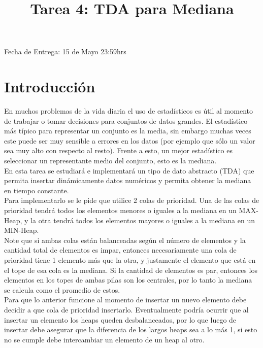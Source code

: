 \documentclass[dcc]{fcfmcourse}
\title{Tarea 4: TDA para Mediana}
\begin{document}
\maketitle
\vspace{-2ex}
\begin{center}
Fecha de Entrega: 15 de Mayo  23:59hrs \\
\end{center}


\section{Introducción}

En muchos problemas de la vida diaria el uso de estadísticos es útil al momento de trabajar o tomar decisiones para conjuntos de datos grandes. El estadístico más típico para representar un conjunto es la media, sin embargo muchas veces este puede ser muy sensible a errores en los datos (por ejemplo que sólo un valor sea muy alto con respecto al resto). Frente a esto, un mejor estadístico es seleccionar un representante medio del conjunto, esto es la mediana. \\

En esta tarea se estudiará e implementará un tipo de dato abstracto (TDA) que permita insertar dinámicamente datos numéricos y permita obtener la mediana en tiempo constante. \\ 

Para implementarlo se le pide que utilice 2 colas de prioridad. Una de las colas de prioridad tendrá todos los elementos menores o iguales a la mediana en un MAX-Heap, y la otra tendrá todos los elementos mayores o iguales a la mediana en un MIN-Heap. \\

Note que si ambas colas están balanceadas según el número de elementos y la cantidad total de elementos es impar, entonces necesariamente una cola de prioridad tiene 1 elemento más que la otra, y justamente el elemento que está en el tope de esa cola es la mediana. Si la cantidad de elementos es par, entonces los elementos en los topes de ambas pilas son los centrales, por lo tanto la mediana se calcula como el promedio de estos. \\

Para que lo anterior funcione al momento de insertar un nuevo elemento debe decidir a que cola de prioridad insertarlo. Eventualmente podría ocurrir que al insertar un elemento los heaps queden desbalanceados, por lo que luego de insertar debe asegurar que la diferencia de los largos heaps sea a lo más 1, si esto no se cumple debe intercambiar un elemento de un heap al otro. \\
\end{document}
